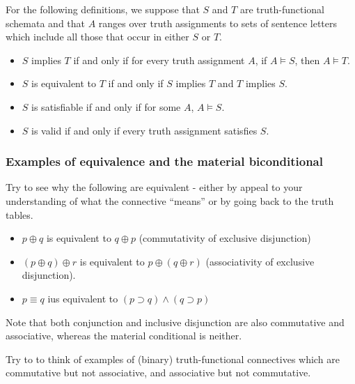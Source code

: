 \begin{definition}\label{tf-eq-sat-val-def}
For the following definitions, we suppose that $S$ and $T$ are truth-functional schemata and that $A$ ranges over truth assignments to sets of sentence letters which include all those that occur in either $S$ or $T$.
\begin{itemize}
\item $S$ implies $T$ if and only if for every truth assignment $A$, if $A\models S$, then $A\models T$.
\item $S$ is equivalent to $T$ if and only if $S$ implies $T$ and $T$ implies $S$.
\item $S$ is satisfiable if and only if for some $A$, $A\models S$.
\item $S$ is valid if and only if every truth assignment satisfies $S$. 
\end{itemize}
\end{definition}

\subsubsection*{Examples of equivalence and the material biconditional}

Try to see why the following are equivalent - either by appeal to your understanding of what the connective ``means'' or by going back to the truth tables. 

\begin{itemize}
\item $p\oplus q$ is equivalent to $q\oplus p$ (commutativity of exclusive disjunction)  
\item $(p\oplus q)\oplus r$ is equivalent to $p\oplus(q\oplus r)$ (associativity of exclusive disjunction).
\item $p \equiv q$ ius equivalent to $(p \supset q) \land (q \supset p)$
\end{itemize}

Note that both conjunction and inclusive disjunction are also commutative and associative, whereas the material conditional is neither. 

\begin{aside}
    Try to to think of examples of (binary) truth-functional connectives which are commutative but not associative, and associative but not commutative.
\end{aside}